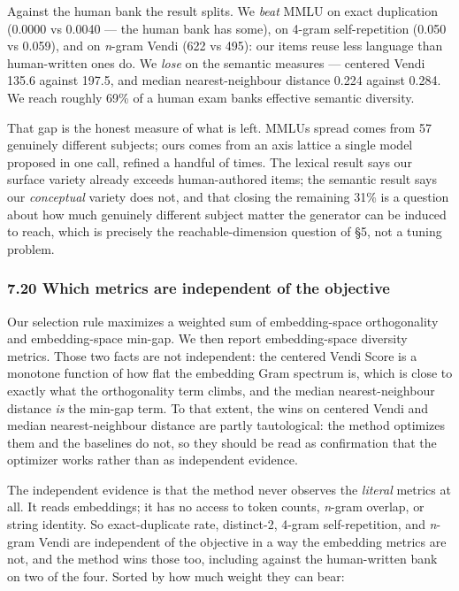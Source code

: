 \documentclass[
  10pt,
]{article}
\theoremstyle{plain}
\theoremstyle{definition}
\begin{document}
Against the human bank the result splits. We \emph{beat} MMLU on exact
duplication (0.0000 vs 0.0040 --- the human bank has some), on 4-gram
self-repetition (0.050 vs 0.059), and on \emph{n}-gram Vendi (622 vs
495): our items reuse less language than human-written ones do. We
\emph{lose} on the semantic measures --- centered Vendi 135.6 against
197.5, and median nearest-neighbour distance 0.224 against 0.284. We
reach roughly 69\% of a human exam bank\textquotesingle s effective
semantic diversity.

That gap is the honest measure of what is left. MMLU\textquotesingle s
spread comes from 57 genuinely different subjects; ours comes from an
axis lattice a single model proposed in one call, refined a handful of
times. The lexical result says our surface variety already exceeds
human-authored items; the semantic result says our \emph{conceptual}
variety does not, and that closing the remaining 31\% is a question
about how much genuinely different subject matter the generator can be
induced to reach, which is precisely the reachable-dimension question of
§5, not a tuning problem.

\subsubsection{7.20 Which metrics are independent of the
objective}\label{720-which-metrics-are-independent-of-the-objective}

Our selection rule maximizes a weighted sum of embedding-space
orthogonality and embedding-space min-gap. We then report
embedding-space diversity metrics. Those two facts are not independent:
the centered Vendi Score is a monotone function of how flat the
embedding Gram spectrum is, which is close to exactly what the
orthogonality term climbs, and the median nearest-neighbour distance
\emph{is} the min-gap term. To that extent, the wins on centered Vendi
and median nearest-neighbour distance are partly tautological: the
method optimizes them and the baselines do not, so they should be read
as confirmation that the optimizer works rather than as independent
evidence.

The independent evidence is that the method never observes the
\emph{literal} metrics at all. It reads embeddings; it has no access to
token counts, \emph{n}-gram overlap, or string identity. So
exact-duplicate rate, distinct-2, 4-gram self-repetition, and
\emph{n}-gram Vendi are independent of the objective in a way the
embedding metrics are not, and the method wins those too, including
against the human-written bank on two of the four. Sorted by how much
weight they can bear:
\end{document}
